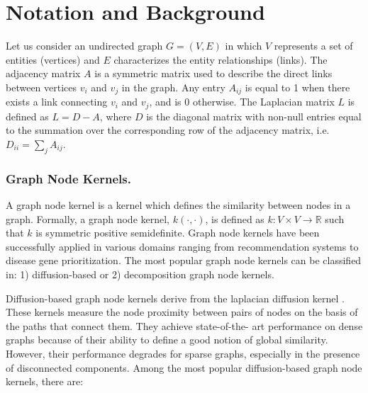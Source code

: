 
\section{Notation and Background}
\label{background}

Let us consider an undirected graph $G = (V, E)$ in which $V$ represents  a
set of entities (vertices)  and $E$ characterizes the entity relationships
(links). The adjacency matrix $A$ is a symmetric matrix used to describe the
direct links between vertices $v_{i}$ and $v_{j}$ in the graph. Any entry
$A_{ij}$ is equal to 1 when there exists a link connecting $v_{i}$ and
$v_{j}$, and is 0 otherwise. The Laplacian matrix $L$ is defined as $L = D-A$,
where $D$ is the diagonal matrix with non-null entries equal to the summation
over the corresponding row of the adjacency matrix, i.e. $D_{ii}=\sum_j
A_{ij}$.

\subsubsection{Graph Node Kernels.}

A graph node kernel is a kernel which defines the similarity between nodes in
a graph. Formally, a graph node kernel, $k(\cdot,\cdot)$, is defined as $k: V
\times V \longrightarrow \mathbb{R}$ such that $k$ is symmetric positive
semidefinite. Graph node kernels have been successfully applied in various
domains ranging from recommendation systems to disease gene prioritization.
The most popular graph node kernels can be classified in: 1) diffusion-based
or 2) decomposition graph node kernels.

Diffusion-based graph node kernels derive from the laplacian diffusion kernel
\cite{proceeding2}. These kernels measure the node proximity between pairs of
nodes on the basis of the paths that connect them. They achieve state-of-the-
art performance on dense graphs because of their ability to define a good
notion of global similarity. However, their performance degrades for sparse
graphs, especially in the presence of disconnected components.
Among the most popular diffusion-based graph node kernels, there are:

